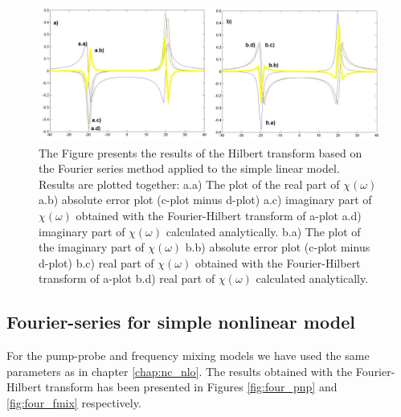 \documentclass[12pt,twoside,a4paper]{article}
\numberwithin{equation}{subsection}
\numberwithin{figure}{subsection}
\begin{document}
\begin{figure} 
  \includegraphics[width=150mm]{img/four_lin.png}
  \caption{ The Figure presents the results of the Hilbert transform based on the Fourier series method applied to the simple linear model.
  Results are plotted together:
   a.a) The plot of the real part of $\chi (\omega )$ 
   a.b) absolute error plot (c-plot minus d-plot) 
   a.c) imaginary part of $\chi (\omega )$ obtained with the Fourier-Hilbert transform of a-plot 
   a.d) imaginary part of $\chi (\omega )$  calculated analytically. 
   b.a) The plot of the imaginary part of $\chi (\omega )$ 
   b.b) absolute error plot (c-plot minus d-plot) 
   b.c) real part of $\chi (\omega )$ obtained with the Fourier-Hilbert transform of a-plot 
   b.d) real part of $\chi (\omega )$ calculated analytically. \label{fig:four_lin}
  }
\end{figure} 

\subsection{Fourier-series for simple nonlinear model} \label{chap:fourier_nlo}

For the pump-probe and frequency mixing models we have used the same parameters as in chapter \ref{chap:nc_nlo}. The results
obtained with the Fourier-Hilbert transform has been presented in Figures \ref{fig:four_pnp} and \ref{fig:four_fmix}
respectively.
\end{document}
